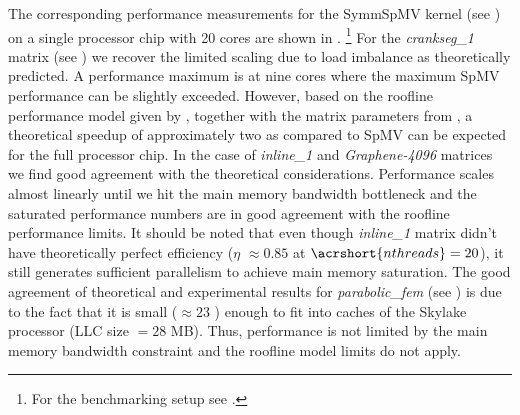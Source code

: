 The corresponding performance measurements for the \acrshort{SymmSpMV} kernel (see ) on a single \SKX processor chip with 20 cores are shown in . \footnote{For the benchmarking setup see .} 
For the \emph{crankseg\_1} matrix (see ) we recover the limited scaling due to load imbalance as theoretically predicted. A performance maximum is at nine cores where the maximum \acrshort{SpMV} performance can be slightly exceeded. However, based on the roofline performance model given by , together with the matrix parameters from , a theoretical speedup of approximately two as compared to \acrshort{SpMV} can be expected for the full processor chip. 
In the case of \emph{inline\_1} and \emph{Graphene-4096} matrices we find good agreement with the theoretical considerations. Performance scales almost linearly until we hit the main memory bandwidth bottleneck and the saturated performance numbers are in good agreement with the roofline performance limits.  
It should be noted that even though \emph{inline\_1} matrix didn't have theoretically perfect efficiency ($\eta$ $\approx 0.85$ at $\acrshort{nthreads}=20$), it still generates sufficient parallelism to achieve main memory saturation. 
The good agreement of theoretical and experimental results for  \emph{parabolic\_fem}  (see ) is due to the fact that it is small ($\approx 23$ \MB) enough to fit into caches of the Skylake processor (\acrshort{LLC} size $= 28$ MB). Thus, performance is not limited by the main memory bandwidth constraint and the roofline model limits do not apply.


